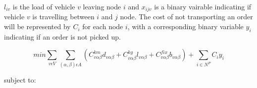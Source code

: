 \documentclass[a4paper,10pt]{article}
\begin{document}
$l_{iv}$ is the load of vehicle $v$ leaving node $i$ and $x_{ijv}$ is a binary vairable indicating if vehicle $v$ is travelling between $i$ and $j$ node. 
The cost of not transporting an order will be represented by $C_i$ for each node $i$, with a corresponding binary variable $y_i$ indicating if an order is not picked up.

\begin{equation}
\label{eq:1}
	min\sum_{v\epsilon V} \sum_{(\alpha, \beta) \epsilon A} ( C^{km}_{v\alpha\beta}d_{v\alpha\beta} + C^{kg}_{v\alpha\beta}l_{v\alpha\beta} + C^{fix}_{v\alpha\beta}b_{v\alpha\beta} ) + \sum_{i\in N^P}C_iy_i
\end{equation}



subject to:

\begingroup
    \allowdisplaybreaks
\end{document}
